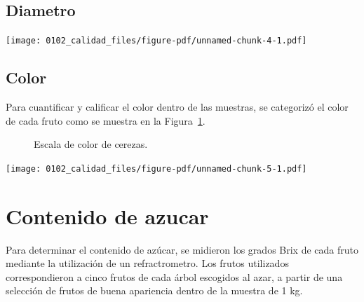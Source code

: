 \documentclass[
  letterpaper,
  DIV=11,
  numbers=noendperiod]{scrreprt}
\begin{document}
\subsection{Diametro}\label{diametro}

\begin{center}
\texttt{[image: 0102\_calidad\_files/figure-pdf/unnamed-chunk-4-1.pdf]}
\end{center}

\subsection{Color}\label{color}

Para cuantificar y calificar el color dentro de las muestras, se
categorizó el color de cada fruto como se muestra en la
Figura~\ref{fig-escala}.

\begin{figure}


\caption{\label{fig-escala}Escala de color de cerezas.}

\end{figure}%

\begin{center}
\texttt{[image: 0102\_calidad\_files/figure-pdf/unnamed-chunk-5-1.pdf]}
\end{center}

\section{Contenido de azucar}\label{contenido-de-azucar}

Para determinar el contenido de azúcar, se midieron los grados Brix de
cada fruto mediante la utilización de un refractrometro. Los frutos
utilizados correspondieron a cinco frutos de cada árbol escogidos al
azar, a partir de una selección de frutos de buena apariencia dentro de
la muestra de 1 kg.
\end{document}
